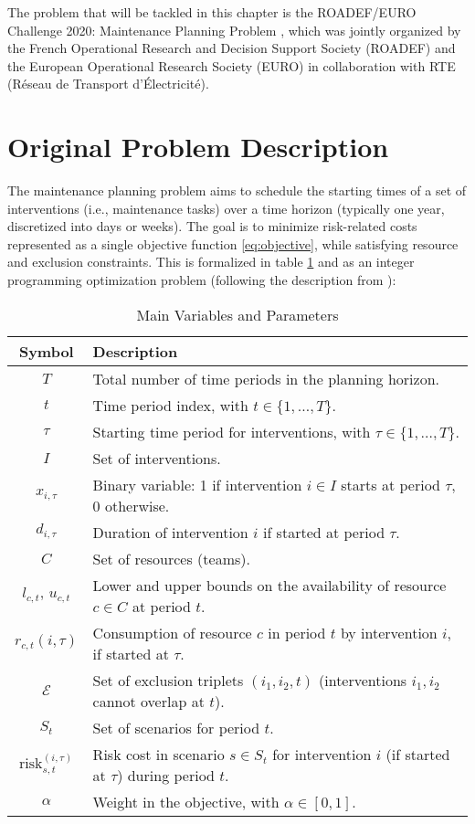 The problem that will be tackled in this chapter is the ROADEF/EURO Challenge 2020: Maintenance Planning Problem \cite{roadef2020}, which was jointly organized by the French Operational Research and Decision Support Society (ROADEF) and the European Operational Research Society (EURO) in collaboration with RTE (Réseau de Transport d'Électricité).

\section{ Original Problem Description}
The maintenance planning problem aims to schedule the starting times of a set of interventions (i.e., maintenance tasks) over a time horizon (typically one year, discretized into days or weeks). The goal is to minimize risk-related costs represented as a single objective function \ref{eq:objective}, while satisfying resource and exclusion constraints. 
This is formalized in table \ref{tab:variables} and as an integer programming optimization problem (following the description from \cite{ConsueloRoadef}):\\


\begin{table}[h]
  \centering
  \begin{tabular}{|c|p{13cm}|}
    \hline
    \textbf{Symbol} & \textbf{Description} \\ \hline
    $T$ & Total number of time periods in the planning horizon. \\ \hline
    $t$ & Time period index, with $t \in \{1,\ldots,T\}$. \\ \hline
    $\tau$ & Starting time period for interventions, with $\tau \in \{1,\ldots,T\}$. \\ \hline
    $I$ & Set of interventions. \\ \hline
    $x_{i,\tau}$ & Binary variable: 1 if intervention $i\in I$ starts at period $\tau$, 0 otherwise. \\ \hline
    $d_{i,\tau}$ & Duration of intervention $i$ if started at period $\tau$. \\ \hline
    $C$ & Set of resources (teams). \\ \hline
    $l_{c,t},\, u_{c,t}$ & Lower and upper bounds on the availability of resource $c\in C$ at period $t$. \\ \hline
    $r_{c,t}(i,\tau)$ & Consumption of resource $c$ in period $t$ by intervention $i$, if started at $\tau$. \\ \hline
    $\mathcal{E}$ & Set of exclusion triplets $(i_1,i_2,t)$ (interventions $i_1,i_2$ cannot overlap at $t$). \\ \hline
    $S_t$ & Set of scenarios for period $t$. \\ \hline
    $\mathrm{risk}_{s,t}^{(i,\tau)}$ & Risk cost in scenario $s\in S_t$ for intervention $i$ (if started at $\tau$) during period $t$. \\ \hline
    $\alpha$ & Weight in the objective, with $\alpha\in[0,1]$. \\ \hline
  \end{tabular}
  \caption{Main Variables and Parameters}
  \label{tab:variables}
\end{table}

